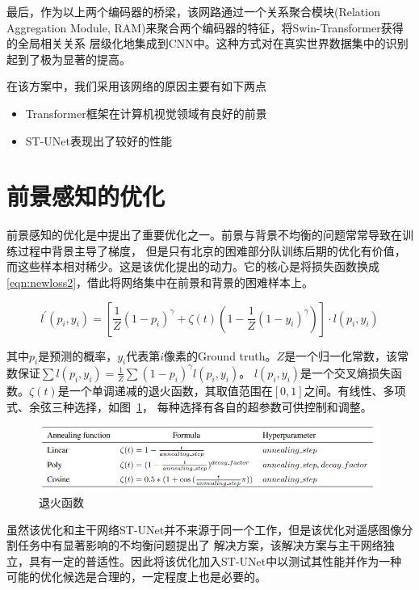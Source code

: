 \documentclass[a4paper,twoside,zihao=5,UTF8]{ctexrep}
\begin{document}
最后，作为以上两个编码器的桥梁，该网路通过一个关系聚合模块(Relation Aggregation Module, RAM)来聚合两个编码器的特征，将Swin-Transformer获得的全局相关关系
层级化地集成到CNN中。这种方式对在真实世界数据集中的识别起到了极为显著的提高\cite{stunet}。

在该方案中，我们采用该网络的原因主要有如下两点

\begin{itemize}
    \item Transformer框架在计算机视觉领域有良好的前景
    \item ST-UNet表现出了较好的性能
\end{itemize}


\section{前景感知的优化}
前景感知的优化是\cite{farseg}中提出了重要优化之一。前景与背景不均衡的问题常常导致在训练过程中背景主导了梯度，
但是只有北京的困难部分队训练后期的优化有价值，而这些样本相对稀少。这是该优化提出的动力。它的核心是将损失函数换成
\eqref{eqn:newloss2}，借此将网络集中在前景和背景的困难样本上。

\begin{equation}
    \label{eqn:newloss2}
    l^{'}(p_i,y_i)=[\frac{1}{Z}(1-p_i)^\gamma+\zeta (t)(1-\frac{1}{Z}(1-y_i)^\gamma)]\cdot l(p_i,y_i)
\end{equation}

其中$p_i$是预测的概率，$y_i$代表第$i$像素的Ground truth。$Z$是一个归一化常数，该常数保证$\sum l(p_i,y_i)=\frac{1}{Z}\sum(1-p_i)^\gamma l(p_i,y_i)$。
$l(p_i,y_i)$是一个交叉熵损失函数。$\zeta(t)$是一个单调递减的退火函数，其取值范围在$[0,1]$之间。有线性、多项式、余弦三种选择，如图~\ref{fig:annel_func}，
每种选择有各自的超参数可供控制和调整。

\begin{figure}[htbp]
    \includegraphics[width=\textwidth]{annealing_funcs.png}
    \centering
    \caption{退火函数}
    \label{fig:annel_func}
\end{figure}

虽然该优化和主干网络ST-UNet并不来源于同一个工作，但是该优化对遥感图像分割任务中有显著影响的不均衡问题提出了
解决方案，该解决方案与主干网络独立，具有一定的普适性。因此将该优化加入ST-UNet中以测试其性能并作为一种
可能的优化候选是合理的，一定程度上也是必要的。
\end{document}
